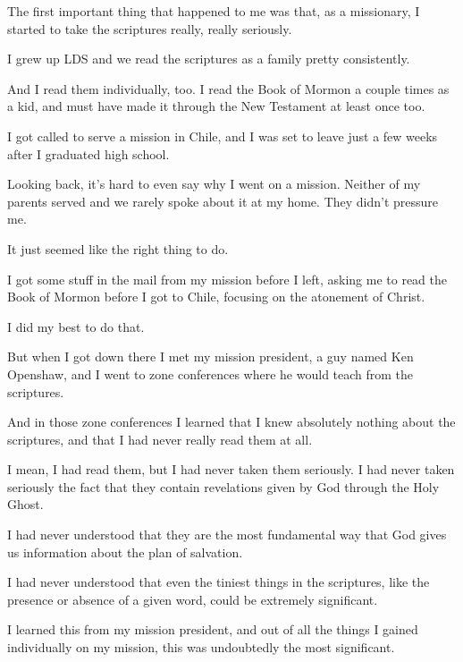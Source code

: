 \begin{compactitem}
			\item The first important thing that happened to me was that, as a missionary, I started to take the scriptures really, really seriously.
				\begin{compactitem}
					\item I grew up LDS and we read the scriptures as a family pretty consistently. 
					\item And I read them individually, too. I read the Book of Mormon a couple times as a kid, and must have made it through the New Testament at least once too.
					\item I got called to serve a mission in Chile, and I was set to leave just a few weeks after I graduated high school.
						\begin{compactitem}
							\item Looking back, it's hard to even say why I went on a mission. Neither of my parents served and we rarely spoke about it at my home. They didn't pressure me.
							\item It just seemed like the right thing to do.
						\end{compactitem}
					\item I got some stuff in the mail from my mission before I left, asking me to read the Book of Mormon before I got to Chile, focusing on the atonement of Christ.
					\item I did my best to do that.
					\item But when I got down there I met my mission president, a guy named Ken Openshaw, and I went to zone conferences where he would teach from the scriptures.
					\item And in those zone conferences I learned that I knew absolutely nothing about the scriptures, and that I had never really read them at all.
					\item I mean, I had read them, but I had never taken them seriously. I had never taken seriously the fact that they contain revelations given by God through the Holy Ghost.
						\begin{compactitem}
							\item I had never understood that they are the most fundamental way that God gives us information about the plan of salvation.
							\item I had never understood that even the tiniest things in the scriptures, like the presence or absence of a given word, could be extremely significant.
							\item I learned this from my mission president, and out of all the things I gained individually on my mission, this was undoubtedly the most significant.

\end{compactitem}
\end{compactitem}
\end{compactitem}
